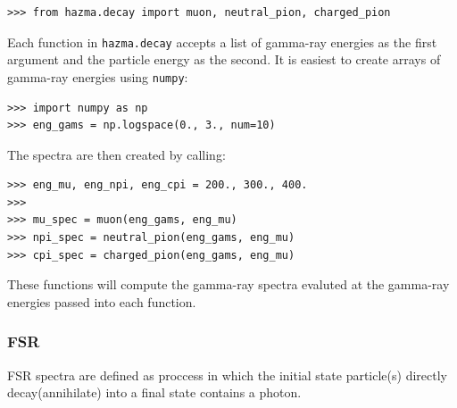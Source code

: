 \documentclass[review]{elsarticle}
\newcommand{\mil}[1]{\texttt{#1}}
\begin{document}
\begin{verbatim}
>>> from hazma.decay import muon, neutral_pion, charged_pion
\end{verbatim}
Each function in \mil{hazma.decay} accepts a list of gamma-ray energies as the first argument and the particle energy as the second. It is easiest to create arrays of gamma-ray energies using \mil{numpy}:
\begin{verbatim}
>>> import numpy as np
>>> eng_gams = np.logspace(0., 3., num=10)
\end{verbatim}
The spectra are then created by calling:
\begin{verbatim}
>>> eng_mu, eng_npi, eng_cpi = 200., 300., 400.
>>>
>>> mu_spec = muon(eng_gams, eng_mu)
>>> npi_spec = neutral_pion(eng_gams, eng_mu)
>>> cpi_spec = charged_pion(eng_gams, eng_mu)
\end{verbatim}
These functions will compute the gamma-ray spectra evaluted at the gamma-ray energies passed into each function.



\subsubsection{FSR}
FSR spectra are defined as proccess in which the initial state particle(s) directly decay(annihilate) into a final state contains a photon.
\end{document}
